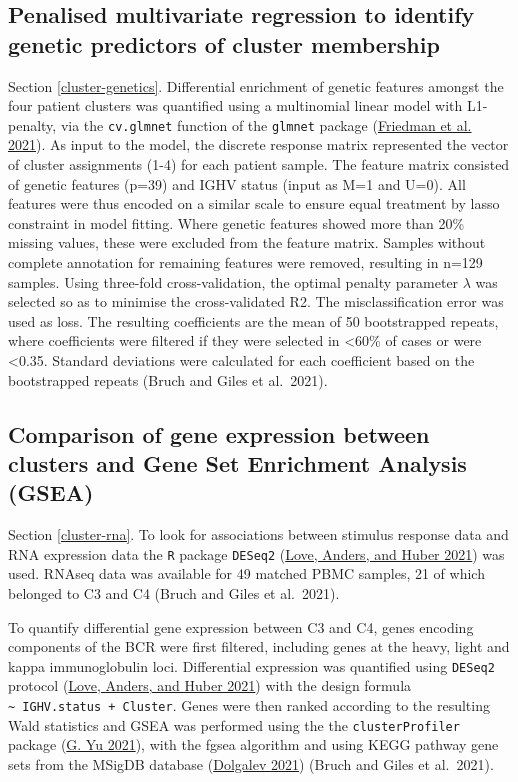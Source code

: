 \documentclass[11pt, a4paper, twosided]{book}
\begin{document}
\hypertarget{cluster-genetics-method}{%
\subsection{Penalised multivariate regression to identify genetic predictors of cluster membership}\label{cluster-genetics-method}}

Section \ref{cluster-genetics}. Differential enrichment of genetic features amongst the four patient clusters was quantified using a multinomial linear model with L1-penalty, via the \texttt{cv.glmnet} function of the \texttt{glmnet} package (\protect\hyperlink{ref-R-glmnet}{Friedman et al. 2021}). As input to the model, the discrete response matrix represented the vector of cluster assignments (1-4) for each patient sample. The feature matrix consisted of genetic features (p=39) and IGHV status (input as M=1 and U=0). All features were thus encoded on a similar scale to ensure equal treatment by lasso constraint in model fitting. Where genetic features showed more than 20\% missing values, these were excluded from the feature matrix. Samples without complete annotation for remaining features were removed, resulting in n=129 samples. Using three-fold cross-validation, the optimal penalty parameter \(\lambda\) was selected so as to minimise the cross-validated R2. The misclassification error was used as loss. The resulting coefficients are the mean of 50 bootstrapped repeats, where coefficients were filtered if they were selected in \textless60\% of cases or were \textless0.35. Standard deviations were calculated for each coefficient based on the bootstrapped repeats (Bruch and Giles et al.~2021).

\hypertarget{cluster-rna-method}{%
\subsection{Comparison of gene expression between clusters and Gene Set Enrichment Analysis (GSEA)}\label{cluster-rna-method}}

Section \ref{cluster-rna}. To look for associations between stimulus response data and RNA expression data the \texttt{R} package \texttt{DESeq2} (\protect\hyperlink{ref-R-DESeq2}{Love, Anders, and Huber 2021}) was used. RNAseq data was available for 49 matched PBMC samples, 21 of which belonged to C3 and C4 (Bruch and Giles et al.~2021).

To quantify differential gene expression between C3 and C4, genes encoding components of the BCR were first filtered, including genes at the heavy, light and kappa immunoglobulin loci. Differential expression was quantified using \texttt{DESeq2} protocol (\protect\hyperlink{ref-R-DESeq2}{Love, Anders, and Huber 2021}) with the design formula \texttt{\textasciitilde{}\ IGHV.status\ +\ Cluster}. Genes were then ranked according to the resulting Wald statistics and GSEA was performed using the the \texttt{clusterProfiler} package (\protect\hyperlink{ref-R-clusterProfiler}{G. Yu 2021}), with the fgsea algorithm and using KEGG pathway gene sets from the MSigDB database (\protect\hyperlink{ref-R-msigdbr}{Dolgalev 2021}) (Bruch and Giles et al.~2021).
\end{document}

